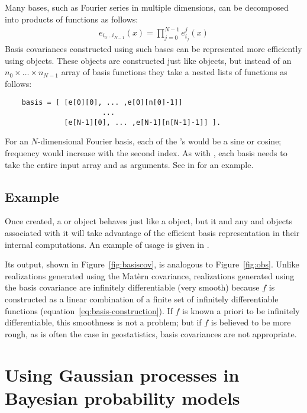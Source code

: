 \documentclass[article]{jss}
\begin{document}
Many bases, such as Fourier series in multiple dimensions, can be decomposed into products of functions as follows:
\begin{eqnarray*}
    e_{i_0\ldots i_{N-1}}(x) = \prod_{j=0}^{N-1}e_{i_j}^j(x)
\end{eqnarray*}
Basis covariances constructed using such bases can be represented more efficiently using  objects. These objects are constructed just like  objects, but instead of an $n_0\times \ldots \times n_{N-1}$ array of basis functions they take a nested lists of functions as follows:
\begin{verbatim}
    basis = [ [e[0][0], ... ,e[0][n[0]-1]]
                       ...
              [e[N-1][0], ... ,e[N-1][n[N-1]-1]] ].
\end{verbatim}
For an $N$-dimensional Fourier basis, each of the 's would be a sine or cosine; frequency would increase with the second index. As with , each basis needs to take the entire input array  and  as arguments. See  in  for an example.

\subsection{Example}

Once created, a  or  object behaves just like a  object, but it and any  and  objects associated with it will take advantage of the efficient basis representation in their internal computations. An example of  usage is given in . 

Its output, shown in Figure~\ref{fig:basiscov}, is analogous to Figure~\ref{fig:obs}. Unlike realizations generated using the Mat\`ern covariance, realizations generated using the basis covariance are infinitely differentiable (very smooth) because $f$ is constructed as a linear combination of a finite set of infinitely differentiable functions (equation~\ref{eq:basis-construction}). If $f$ is known a priori to be infinitely differentiable, this smoothness is not a problem; but if $f$ is believed to be more rough, as is often the case in geostatistics, basis covariances are not appropriate.


\section{Using Gaussian processes in Bayesian probability models}
\label{sec:gp-sub} 
\end{document}
